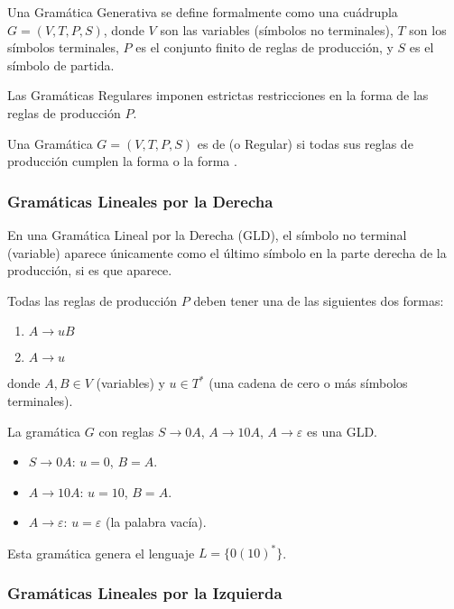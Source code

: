 Una Gramática Generativa se define formalmente como una cuádrupla $G = (V, T, P, S)$, donde $V$ son las variables (símbolos no terminales), $T$ son los símbolos terminales, $P$ es el conjunto finito de reglas de producción, y $S$ es el símbolo de partida.

Las Gramáticas Regulares imponen estrictas restricciones en la forma de las reglas de producción $P$.

\begin{definicion}
Una Gramática $G = (V, T, P, S)$ es de  (o Regular) si todas sus reglas de producción cumplen la forma  o la forma .
\end{definicion}

\subsubsection{Gramáticas Lineales por la Derecha}

En una Gramática Lineal por la Derecha (GLD), el símbolo no terminal (variable) aparece únicamente como el último símbolo en la parte derecha de la producción, si es que aparece.

\begin{definicion}
Todas las reglas de producción $P$ deben tener una de las siguientes dos formas:
\begin{enumerate}
    \item $A \to uB$
    \item $A \to u$
\end{enumerate}
donde $A, B \in V$ (variables) y $u \in T^*$ (una cadena de cero o más símbolos terminales).
\end{definicion}

\begin{ejemplo}[GLD]
La gramática $G$ con reglas $S \to 0A$, $A \to 10A$, $A \to \varepsilon$ es una GLD.
\begin{itemize}
    \item $S \to 0A$: $u=0$, $B=A$.
    \item $A \to 10A$: $u=10$, $B=A$.
    \item $A \to \varepsilon$: $u=\varepsilon$ (la palabra vacía).
\end{itemize}
Esta gramática genera el lenguaje $L = \{0(10)^*\}$.
\end{ejemplo}

\subsubsection{Gramáticas Lineales por la Izquierda}


